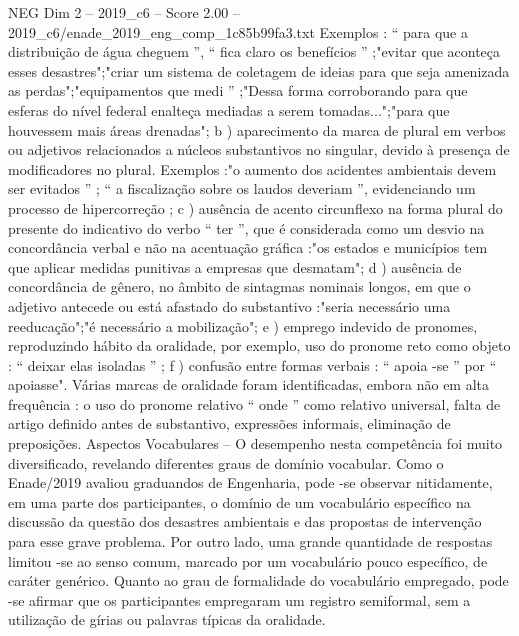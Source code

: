 \begin{textsample}{NEG Dim 2 – 2019\_c6 – Score 2.00 – 2019\_c6/enade\_2019\_eng\_comp\_1c85b99fa3.txt}
Exemplos : “ para que a distribuição de água cheguem ”, “ fica claro os benefícios ” ;"evitar que aconteça esses desastres";"criar um sistema de coletagem de ideias para que seja amenizada as perdas";"equipamentos que medi ” ;"Dessa forma corroborando para que esferas do nível federal enalteça mediadas a serem tomadas...";"para que houvessem mais áreas drenadas"; b ) aparecimento da marca de plural em verbos ou adjetivos relacionados a núcleos substantivos no singular, devido à presença de modificadores no plural.
Exemplos :"o aumento dos acidentes ambientais devem ser evitados ” ; “ a fiscalização sobre os laudos deveriam ”, evidenciando um processo de hipercorreção ; c ) ausência de acento circunflexo na forma plural do presente do indicativo do verbo “ ter ”, que é considerada como um desvio na concordância verbal e não na acentuação gráfica :"os estados e municípios tem que aplicar medidas punitivas a empresas que desmatam"; d ) ausência de concordância de gênero, no âmbito de sintagmas nominais longos, em que o adjetivo antecede ou está afastado do substantivo :"seria necessário uma reeducação";"é necessário a mobilização"; e ) emprego indevido de pronomes, reproduzindo hábito da oralidade, por exemplo, uso do pronome reto como objeto : “ deixar elas isoladas ” ; f ) confusão entre formas verbais : “ apoia -se ” por “ apoiasse".
Várias marcas de oralidade foram identificadas, embora não em alta frequência : o uso do pronome relativo “ onde ” como relativo universal, falta de artigo definido antes de substantivo, expressões informais, eliminação de preposições.
Aspectos Vocabulares – O desempenho nesta competência foi muito diversificado, revelando diferentes graus de domínio vocabular.
Como o Enade/2019 avaliou graduandos de Engenharia, pode -se observar nitidamente, em uma parte dos participantes, o domínio de um vocabulário específico na discussão da questão dos desastres ambientais e das propostas de intervenção para esse grave problema.
Por outro lado, uma grande quantidade de respostas limitou -se ao senso comum, marcado por um vocabulário pouco específico, de caráter genérico.
Quanto ao grau de formalidade do vocabulário empregado, pode -se afirmar que os participantes empregaram um registro semiformal, sem a utilização de gírias ou palavras típicas da oralidade.

\end{textsample}
